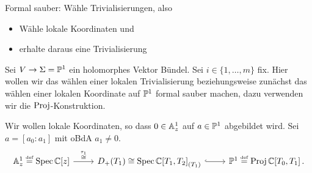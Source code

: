 \begin{ex}
Formal sauber: Wähle Trivialisierungen, also
\begin{itemize}
\item Wähle lokale Koordinaten und
\item erhalte daraus eine Trivialisierung
\end{itemize}
\end{ex}
Sei $V\to\Sigma=\P^1$ ein holomorphes Vektor Bündel.
Sei $i\in\{1,\dots,m\}$ fix.
Hier wollen wir das wählen einer lokalen Trivialisierung beziehungsweise
zunächst das wählen einer lokalen Koordinate auf $\P^1$ formal sauber machen,
dazu verwenden wir die $\Proj$-Konstruktion.\\

\begin{comment}
\[ \begin{tikzcd}[row sep=1em,column sep=.5em]
{}&{}&\P^1
\\
\left[ \frac{\alpha + a_0}{a_1}:1 \right]
  &D_+(T_0) \ar[hook]{ur}
  & & D_+(T_1) \ar[hook]{ul}
  &\left[ 1:\frac{a_1}{\alpha + a_0} \right]
\\
\\
\\
{}&{}&\A_z^1 \ar[dashed]{uuul}{\cong} \ar[dashed]{uuur}{\cong}
\\
{}&{}&(z-\alpha) \ar[|->,dashed]{uuuull} \ar[|->,dashed]{uuuurr}
\end{tikzcd} \]
\end{comment}

\begin{comment}
\[ \begin{tikzcd}[row sep=1em,column sep=0]
  {}& {}& D_+(T_0) \cong \Spec \C{[T_0,T_1]}_{(T_0)}
    \ar[hook,in=90,out=0]{ddr}
\\
  {}& {}& D_+(T_1) \cong \Spec \C{[T_0,T_1]}_{(T_1)}
    \ar[hook,in=90,out=0]{dr}
\\
0 \in\ar[|->,bend right=40]{rrrr}{?}
  &\A_z^1\bydef\Spec\C[z]
    \ar[in=180,out=90]{ur}{\cong} \ar[in=180,out=270]{dr}{\cong}
    \ar[in=180,out=90]{uur}{\cong}
  & \cap
    \ar[bend right=20,dashed]{u}
    \ar[bend right=20,dashed]{d}
  & \P^1 \bydef \Proj\C[T_0,T_1]
  & \ni a
\\
  {}&{}& D_+(f) \cong \Spec \C{[T_1,T_2]}_{(f)}
    \ar[hook,in=270,out=0]{ur}
\\
\end{tikzcd} \]
\end{comment}

\begin{comment}
Versuch 1
\end{comment}
Wir wollen lokale Koordinaten, so dass $0\in\A_z^1$ auf $a\in\P^1$ abgebildet
wird. Sei $a=[a_0:a_1]$ mit oBdA $a_1\neq0$.
\[ \begin{tikzcd}
\A_z^1\bydef\Spec\C[z] \rar{\overset{\tau_1}\cong} 
  &D_+(T_1) \cong \Spec \C{[T_1,T_2]}_{(T_1)} \rar[hook]
  & \P^1 \bydef \Proj\C[T_0,T_1] \,.
\end{tikzcd} \]

